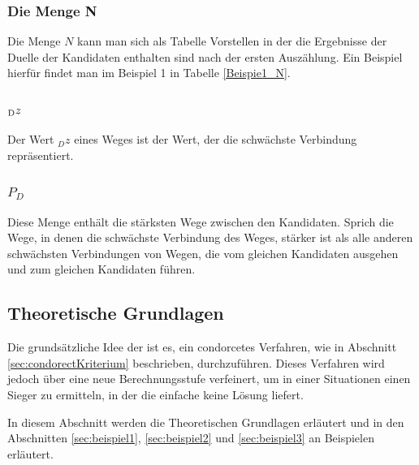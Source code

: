 \subsubsection{Die Menge N}
\label{mengeN}
Die Menge $N$ kann man sich als Tabelle Vorstellen in der die Ergebnisse der Duelle der Kandidaten enthalten sind nach der ersten Auszählung. Ein Beispiel hierfür findet man im Beispiel 1 in Tabelle \ref{Beispie1_N}.
\newpage

\subsubsection{$\textsubscript{D}z$}
\label{dz}
Der Wert $_{D}z$ eines Weges ist der Wert, der die schwächste Verbindung repräsentiert.

\subsubsection{$P_{D}$}
\label{PD}
Diese Menge enthält die stärksten Wege zwischen den Kandidaten. Sprich die Wege, in denen die schwächste Verbindung des Weges, stärker ist als alle anderen schwächsten Verbindungen von Wegen, die vom gleichen Kandidaten ausgehen und zum gleichen Kandidaten führen.
\newpage
\subsection{Theoretische Grundlagen} 
\label{sec:theoretische Grundlagen}

Die grundsätzliche Idee der \schulze ist es, ein condorcetes Verfahren, wie in Abschnitt \ref{sec:condorectKriterium} beschrieben, durchzuführen. Dieses Verfahren wird jedoch über eine neue Berechnungsstufe verfeinert, um in einer Situationen einen Sieger zu ermitteln, in der die einfache \condorcetMethode keine Lösung liefert.

In diesem Abschnitt werden die Theoretischen Grundlagen erläutert und in den Abschnitten \ref{sec:beispiel1},  \ref{sec:beispiel2} und \ref{sec:beispiel3} an Beispielen erläutert.


\def\namedlabel#1#2{\begingroup
    #2%
    \def\@currentlabel{#2}%
    \phantomsection\label{#1}\endgroup
}

